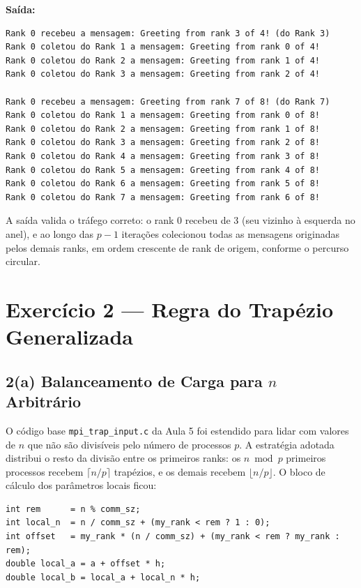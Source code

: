 \documentclass[12pt,a4paper]{article}
\begin{document}
\textbf{Saída:}
\begin{lstlisting}[style=shell]
Rank 0 recebeu a mensagem: Greeting from rank 3 of 4! (do Rank 3)
Rank 0 coletou do Rank 1 a mensagem: Greeting from rank 0 of 4!
Rank 0 coletou do Rank 2 a mensagem: Greeting from rank 1 of 4!
Rank 0 coletou do Rank 3 a mensagem: Greeting from rank 2 of 4!

Rank 0 recebeu a mensagem: Greeting from rank 7 of 8! (do Rank 7)
Rank 0 coletou do Rank 1 a mensagem: Greeting from rank 0 of 8!
Rank 0 coletou do Rank 2 a mensagem: Greeting from rank 1 of 8!
Rank 0 coletou do Rank 3 a mensagem: Greeting from rank 2 of 8!
Rank 0 coletou do Rank 4 a mensagem: Greeting from rank 3 of 8!
Rank 0 coletou do Rank 5 a mensagem: Greeting from rank 4 of 8!
Rank 0 coletou do Rank 6 a mensagem: Greeting from rank 5 of 8!
Rank 0 coletou do Rank 7 a mensagem: Greeting from rank 6 of 8!
\end{lstlisting}

A saída valida o tráfego correto: o rank 0 recebeu de 3 (seu vizinho à esquerda no anel), e ao longo das $p-1$ iterações colecionou todas as mensagens originadas pelos demais ranks, em ordem crescente de rank de origem, conforme o percurso circular.

\section{Exercício 2 — Regra do Trapézio Generalizada}

\subsection{2(a) Balanceamento de Carga para $n$ Arbitrário}

O código base \texttt{mpi\_trap\_input.c} da Aula 5 foi estendido para lidar com valores de $n$ que não são divisíveis pelo número de processos $p$. A estratégia adotada distribui o resto da divisão entre os primeiros ranks: os $n \bmod p$ primeiros processos recebem $\lceil n/p \rceil$ trapézios, e os demais recebem $\lfloor n/p \rfloor$. O bloco de cálculo dos parâmetros locais ficou:

\begin{lstlisting}[style=ccode]
int rem      = n % comm_sz;
int local_n  = n / comm_sz + (my_rank < rem ? 1 : 0);
int offset   = my_rank * (n / comm_sz) + (my_rank < rem ? my_rank : rem);
double local_a = a + offset * h;
double local_b = local_a + local_n * h;
\end{lstlisting}
\end{document}
